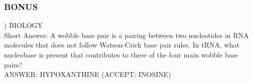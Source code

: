 \documentclass{article}
\begin{document}
\subsubsection*{BONUS}
) BIOLOGY \\
Short Answer: A wobble base pair is a pairing between two nucleotides in RNA molecules that does not follow Watson-Crick base pair rules. In tRNA, what nucleobase is present that contributes to three of the four main wobble base pairs? \\
ANSWER: HYPOXANTHINE (ACCEPT: INOSINE)
\end{document}
